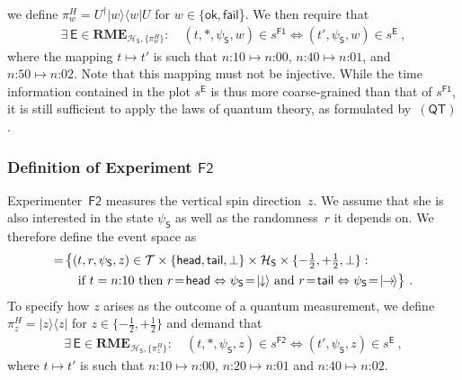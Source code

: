 \documentclass{article}
\theoremstyle{plain}
\theoremstyle{definition}
\newcommand*{\cH}{\mathcal{H}}
\newcommand*{\cT}{\mathcal{T}}
\newcommand*{\ket}[1]{{| #1 \rangle}}
\newcommand{\proj}[1]{|#1\rangle\!\langle #1|}
\newcommand*{\Exp}{\mathsf{E}}
\newcommand*{\Friendone}{\mathsf{F1}}
\newcommand*{\Friendtwo}{\mathsf{F2}}
\newcommand*{\Spin}{\mathsf{S}}
\newcommand*{\RME}{\mathbf{RME}}
\newcommand*{\spindown}{\ket{{\hspace{-0.1ex}\downarrow\hspace{-0.1ex}}}}
\newcommand*{\spinright}{\ket{{\hspace{-0.2ex}\rightarrow\hspace{-0.4ex}}}}
\newcommand*{\sminus}{{\textstyle - \frac{1}{2}}}
\newcommand*{\splus}{{\textstyle + \frac{1}{2}}}
\newcommand*{\QT}{\mathsf{(QT)}}
\newcommand*{\ok}{\mathsf{ok}}
\newcommand*{\fail}{\mathsf{fail}}
\newcommand*{\head}{\mathsf{head}}
\newcommand*{\tail}{\mathsf{tail}}
\begin{document}
we define $\pi^H_{w} = U^{\dagger}  \proj{w} U$ for $w \in \{ \ok, \fail$\}. We then require that 
\begin{align} \label{eq_FriendoneM}
 \exists \,   \Exp \in \RME_{\cH_{\Spin}, \{\pi^H_w\}} : \quad  (t, *, \psi_\Spin, w) \in s^{\Friendone} \iff (t', \psi_\Spin, w) \in s^{\Exp} \ ,
\end{align}
where the mapping $t \mapsto t'$ is such that $\text{$n$:10} \mapsto \text{$n$:00}$, $\text{$n$:40} \mapsto \text{$n$:01}$, and $\text{$n$:50} \mapsto \text{$n$:02}$.   Note that this mapping must not be injective. While the time information contained in the plot $s^{\Exp}$ is thus more coarse-grained than that of $s^{\Friendone}$, it is still sufficient to apply the laws of quantum theory, as formulated by~$\QT$.

\subsubsection*{Definition of Experiment $\Friendtwo$}

Experimenter~$\Friendtwo$ measures the vertical spin direction~$z$. We assume that she is also interested in the state $\psi_\Spin$ as well as the randomness~$r$ it depends on. We therefore define the event space as
\begin{align}
  [\Friendtwo]  = \, & \bigl\{(t, r, \psi_\Spin, z)   \in \cT \times \{\head,\tail,\bot\} \times \cH_{\Spin} \times \{\sminus, \splus, \bot\} : \, \nonumber 
\\  & \quad  \text{if } t = \text{$n$:10} \text{ then } r \! = \! \head \Leftrightarrow \psi_{\Spin} \! = \! \spindown \text{ and }  r \! = \! \tail \Leftrightarrow \psi_{\Spin} \! = \! \spinright  \label{eq_Ftworpsi}
 \bigr\} \ .
  \end{align}
  To specify how $z$ arises as the outcome of a quantum measurement, we define $\pi^H_{z} = \proj{z}$  for $z \in \{\sminus, \splus\}$ and demand that  
  \begin{align} \label{eq_FriendtwoM}
 \exists \,  \Exp \in \RME_{\cH_{\Spin}, \{\pi^H_z\}} : \quad  (t, *, \psi_\Spin, z) \in s^{\Friendtwo} \iff (t', \psi_\Spin, z) \in s^{\Exp} \ ,
\end{align}
where $t \mapsto t'$ is such that $\text{$n$:10} \mapsto \text{$n$:00}$, $\text{$n$:20} \mapsto \text{$n$:01}$ and $\text{$n$:40} \mapsto \text{$n$:02}$. 
\end{document}
